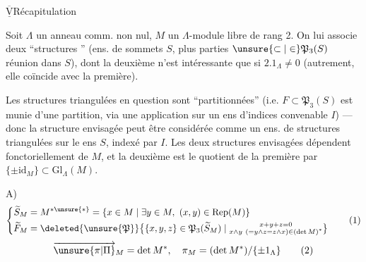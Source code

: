 $\overline{\underline{\mathrm V}}$\quad Récapitulation

Soit $\Lambda$ un anneau comm. non nul, $M$ un $\Lambda$-module libre de rang 2. On lui associe deux ``structures '' (ens. de sommets $S$, plus   parties   $\unsure{\subset|\in}\mathfrak P_3(S)$   réunion dans $S$), dont la deuxième n'est intéressante que si $2.1_\Lambda\ne0$ (autrement, elle coïncide avec la première).

Les structures triangulées  en question sont ``partitionnées'' (i.e. $F\subset\mathfrak P_3(S)$ est munie d'une partition, via une application sur un ens d'indices convenable $I$) --- donc la structure envisagée peut être considérée comme un ens. de structures triangulées sur le  ens $S$, indexé par $I$. Les deux structures envisagées dépendent fonctoriellement de $M$, et la deuxième est le quotient de la première par $\{\pm\mathrm{id}_M\}\subset\mathrm{Gl}_\Lambda(M)$.

A)
\[
 \left\{\begin{aligned}
 \widetilde S_M&=M^{*\unsure{*}}=\{x\in M\mid\exists y\in M,\ (x,y)\in\operatorname{Rep}(M)\}\\
 \widetilde F_M&=\deleted{\unsure{\mathfrak P}}\bigl\{\{x,y,z\}\in\mathfrak P_3(\widetilde S_M)\mid
 \substack{x+y+z=0\\x\wedge y\ (=y\wedge z=z\wedge x)\in(\det M)^*}\bigr\}
 \end{aligned}\right.\tag*{(1)}
\]
\[
 \overrightarrow{\unsure{\pi|\Pi}}_M=\det M^*,\quad \pi_M=(\det M^*)/\{\pm1_\Lambda\}\tag*{(2)}
\]
